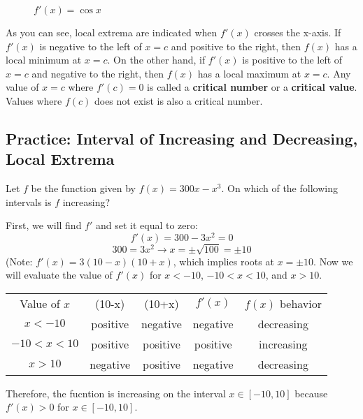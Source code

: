 \begin{figure}
	\centering
	\caption{$f'(x) = \cos{x}$}
	\label{fig:fprimecos}
\end{figure}


As you can see, local extrema are indicated when $f'(x)$ crosses the x-axis. If $f'(x)$ is negative to the left of $x=c$ and positive to the right, then $f(x)$ has a local minimum at $x=c$. On the other hand, if $f'(x)$ is positive to the left of $x=c$ and negative to the right, then $f(x)$ has a local maximum at $x=c$. Any value of $x=c$ where $f'(c) = 0$ is called a \textbf{critical number} or a \textbf{critical value}. Values where $f(c)$ does not exist is also a critical number. 

\subsection{Practice: Interval of Increasing and Decreasing, Local Extrema}
\begin{Exercise}
    [label=incdec1]
    Let $f$ be the function given by $f(x) = 300x-x^3$. On which of the following intervals is $f$ increasing?
\end{Exercise}

\begin{Answer}
    [ref=incdec1]
    First, we will find $f'$ and set it equal to zero: $$f'(x)=300-3x^2=0$$ $$300=3x^2 \rightarrow x=\pm \sqrt{100} = \pm10$$ (Note: $f'(x) = 3(10-x)(10+x)$, which implies roots at $x=\pm10$. Now we will evaluate the value of $f'(x)$ for $x<-10$, $-10<x<10$, and $x>10$. 
    \begin{center}
        \begin{tabular}{c|c|c|c|c}
        Value of $x$ & (10-x) & (10+x) & $f'(x)$ & $f(x)$ behavior\\
         $x<-10$    &  positive & negative& negative & decreasing\\
         $-10<x<10$    & positive & positive& positive& increasing\\
         $x>10$ & negative & positive & negative & decreasing
        \end{tabular}
    \end{center}
    Therefore, the fucntion is increasing on the interval $x \in [-10, 10]$ because $f'(x) >0$ for $x \in [-10, 10]$.
\end{Answer}

